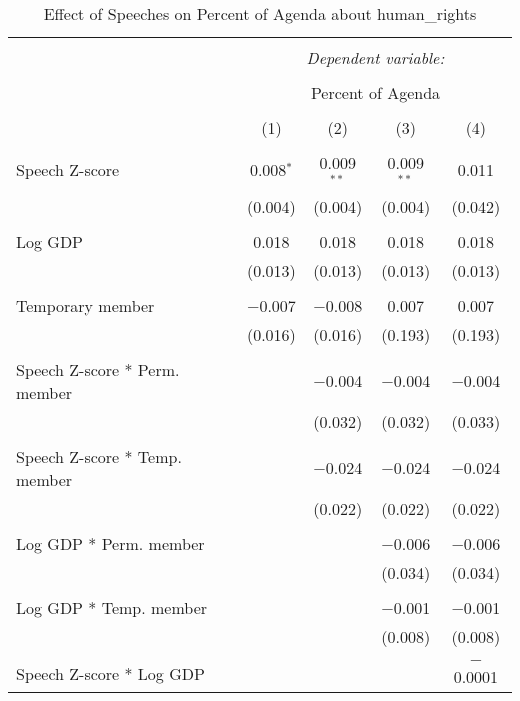 
\begin{table}[!htbp] \centering 
  \caption{Effect of Speeches on Percent of Agenda about human_rights} 
  \label{} 
\begin{tabular}{@{\extracolsep{5pt}}lcccc} 
\\[-1.8ex]\hline 
\hline \\[-1.8ex] 
 & \multicolumn{4}{c}{\textit{Dependent variable:}} \\ 
\cline{2-5} 
\\[-1.8ex] & \multicolumn{4}{c}{Percent of Agenda} \\ 
\\[-1.8ex] & (1) & (2) & (3) & (4)\\ 
\hline \\[-1.8ex] 
 Speech Z-score & 0.008$^{*}$ & 0.009$^{**}$ & 0.009$^{**}$ & 0.011 \\ 
  & (0.004) & (0.004) & (0.004) & (0.042) \\ 
  & & & & \\ 
 Log GDP & 0.018 & 0.018 & 0.018 & 0.018 \\ 
  & (0.013) & (0.013) & (0.013) & (0.013) \\ 
  & & & & \\ 
 Temporary member & $-$0.007 & $-$0.008 & 0.007 & 0.007 \\ 
  & (0.016) & (0.016) & (0.193) & (0.193) \\ 
  & & & & \\ 
 Speech Z-score * Perm. member &  & $-$0.004 & $-$0.004 & $-$0.004 \\ 
  &  & (0.032) & (0.032) & (0.033) \\ 
  & & & & \\ 
 Speech Z-score * Temp. member &  & $-$0.024 & $-$0.024 & $-$0.024 \\ 
  &  & (0.022) & (0.022) & (0.022) \\ 
  & & & & \\ 
 Log GDP * Perm. member &  &  & $-$0.006 & $-$0.006 \\ 
  &  &  & (0.034) & (0.034) \\ 
  & & & & \\ 
 Log GDP * Temp. member &  &  & $-$0.001 & $-$0.001 \\ 
  &  &  & (0.008) & (0.008) \\ 
  & & & & \\ 
 Speech Z-score * Log GDP &  &  &  & $-$0.0001 \\ 

\end{tabular}
\end{table}
